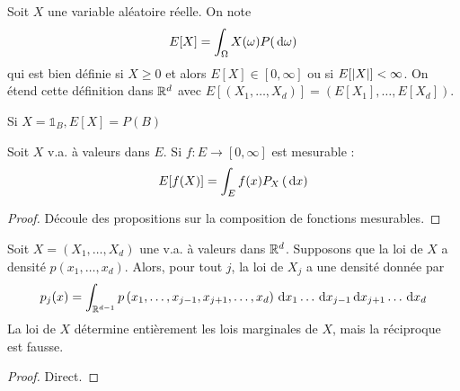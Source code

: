 \documentclass{cours}
\begin{document}
    \begin{definition}
        Soit $X$ une variable aléatoire réelle. On note \[E[X] = \int_{\Omega}X(\omega)P({\rm \, d} \omega)\]
        qui est bien définie si $X \geq 0$ et alors $E[X] \in \left[0, \infty\right]$ ou si $E[\left|X\right|] < \infty$. On étend cette définition dans $\mathbb{R}^{d}$ avec $E\left[\left(X_{1}, \ldots, X_{d}\right)\right] = \left(E[X_{1}], \ldots, E[X_{d}]\right)$.
    \end{definition}

    \begin{proposition}
        Si $X = \mathds{1}_{B}, E[X] = P(B)$ 
    \end{proposition}

    \begin{proposition}
        Soit $X$ v.a. à valeurs dans $E$. Si $f : E \rightarrow \left[0, \infty\right]$ est mesurable : 
        \[
            E[f(X)] = \int_{E} f(x)P_{X}\left({\rm \, d} x\right)
        \]
    \end{proposition}
    \begin{proof}
        Découle des propositions sur la composition de fonctions mesurables.
    \end{proof}

    \begin{proposition}
        Soit $X = \left(X_{1}, \ldots, X_{d}\right)$ une v.a. à valeurs dans $\mathbb{R}^{d}$. Supposons que la loi de $X$ a densité $p\left(x_{1}, \ldots, x_{d}\right)$. Alors, pour tout $j$, la loi de $X_{j}$ a une densité donnée par 
        \[
            p_{j}(x) = \int_{\mathbb{R}^{d - 1}} p\left(x_{1}, \ldots, x_{j - 1}, x_{j + 1}, \ldots, x_{d}\right){\rm \, d} x_{1} \ldots {\rm \, d} x_{j - 1} {\rm \, d} x_{j + 1}\ldots {\rm \, d} x_{d}
        \]
        La loi de $X$ détermine entièrement les lois marginales de $X$, mais la réciproque est fausse. 
    \end{proposition}
    \begin{proof}
        Direct.
    \end{proof}
\end{document}
